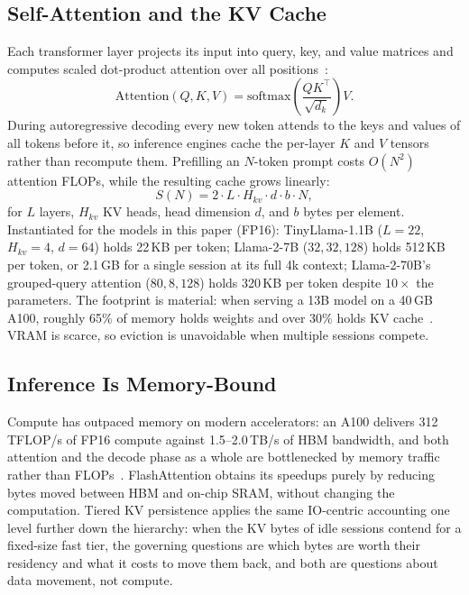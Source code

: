 \documentclass[letterpaper,twocolumn,10pt]{article}
\begin{document}
\subsection{Self-Attention and the KV Cache}
Each transformer layer projects its input into query, key, and value matrices and computes scaled dot-product attention over all positions~\cite{vaswani2017attention}:
\begin{equation}
  \mathrm{Attention}(Q,K,V) = \mathrm{softmax}\!\left(\frac{QK^{\top}}{\sqrt{d_k}}\right)V.
  \label{eq:attention}
\end{equation}
During autoregressive decoding every new token attends to the keys and values of all tokens before it, so inference engines cache the per-layer $K$ and $V$ tensors rather than recompute them. Prefilling an $N$-token prompt costs $O(N^2)$ attention FLOPs, while the resulting cache grows linearly:
\begin{equation}
  S(N) = 2 \cdot L \cdot H_{kv} \cdot d \cdot b \cdot N,
  \label{eq:kvsize}
\end{equation}
for $L$ layers, $H_{kv}$ KV heads, head dimension $d$, and $b$ bytes per element. Instantiated for the models in this paper (FP16): TinyLlama-1.1B ($L{=}22$, $H_{kv}{=}4$, $d{=}64$) holds 22\,KB per token; Llama-2-7B ($32, 32, 128$) holds 512\,KB per token, or 2.1\,GB for a single session at its full 4k context; Llama-2-70B's grouped-query attention ($80, 8, 128$) holds 320\,KB per token despite $10\times$ the parameters. The footprint is material: when serving a 13B model on a 40\,GB A100, roughly 65\% of memory holds weights and over 30\% holds KV cache~\cite{kwon2023pagedattention}. VRAM is scarce, so eviction is unavoidable when multiple sessions compete.

\subsection{Inference Is Memory-Bound}
Compute has outpaced memory on modern accelerators: an A100 delivers 312 TFLOP/s of FP16 compute against 1.5--2.0\,TB/s of HBM bandwidth, and both attention and the decode phase as a whole are bottlenecked by memory traffic rather than FLOPs~\cite{dao2022flashattention,kwon2023pagedattention}. FlashAttention obtains its speedups purely by reducing bytes moved between HBM and on-chip SRAM, without changing the computation. Tiered KV persistence applies the same IO-centric accounting one level further down the hierarchy: when the KV bytes of idle sessions contend for a fixed-size fast tier, the governing questions are which bytes are worth their residency and what it costs to move them back, and both are questions about data movement, not compute.
\end{document}
